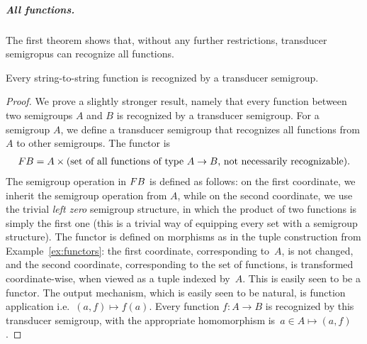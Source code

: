 \subparagraph{All functions.} The first theorem shows that, without any further restrictions, transducer semigropus can recognize all functions.

\begin{theorem}\label{thm:all-functions} 
 Every string-to-string function is recognized by a transducer semigroup.
\end{theorem}
\begin{proof}
 We prove a slightly stronger result, namely that every function between two semigroups $A$ and $B$ is recognized by a transducer semigroup.
 For a semigroup $A$, we define a transducer semigroup that recognizes all functions from $A$ to other semigroups. The functor is 
 \begin{align*}
 \functor B = A \times \text{(set of all functions of type $A \to B$, not necessarily recognizable)}.
 \end{align*}
 The semigroup operation in $\functor B$ is defined as follows: on the first coordinate, we inherit the semigroup operation from $A$, while on the second coordinate, we use the trivial \emph{left zero} semigroup structure, in which  the product of two functions is simply the first one (this is a trivial way of equipping every set with a semigroup structure). The functor is defined on morphisms
as in the tuple construction from Example~\ref{ex:functors}: the first coordinate, corresponding to~$A$, is not changed, and the second coordinate, corresponding to the set of functions, is transformed coordinate-wise, when viewed as a tuple indexed by~$A$. This is easily seen to be a functor. The output mechanism, which is easily seen to be natural, is function application i.e.~$(a,f) \mapsto f(a)$.
Every function $f : A \to B$ is recognized by this transducer semigroup, with the appropriate homomorphism is~$a \in A \mapsto (a,f)$.
\end{proof}

